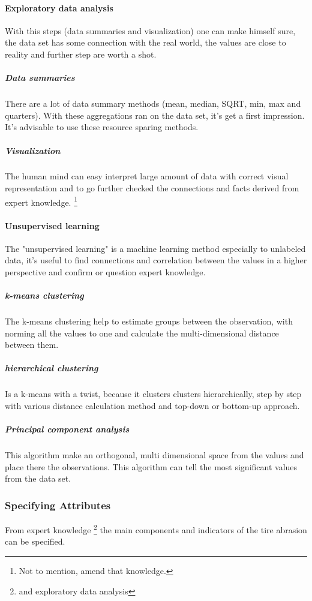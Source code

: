 		\paragraph{Exploratory data analysis}
			With this steps (data summaries and visualization) one can make himself sure, the data set has some connection with the real world, the values are close to reality and further step are worth a shot.
			\subparagraph{Data summaries}
			There are a lot of data summary methods (mean, median, SQRT, min, max and quarters). With these aggregations ran on the data set, it's get a first impression. It's advisable to use these resource sparing methods.
			\subparagraph{Visualization}
			The human mind can easy interpret large amount of data with correct visual representation and to go further checked the connections and facts derived from expert knowledge. \footnote{Not to mention, amend that knowledge.} 
		\paragraph{Unsupervised learning}
		The "unsupervised learning" is a machine learning method especially to unlabeled data, it's useful to find connections and correlation between the values in a higher perspective and confirm or question expert knowledge.

		\subparagraph{k-means clustering}
		\cite{k-means} The k-means clustering help to estimate groups between the observation, with norming all the values to one and calculate the multi-dimensional distance between them.
		\subparagraph{hierarchical clustering}
		\cite{h-clust} Is a k-means with a twist, because it clusters clusters hierarchically, step by step with various distance calculation method and top-down or bottom-up approach.
		\subparagraph{Principal component analysis}
		\cite{PCA}
		This algorithm make an orthogonal, multi dimensional space from the values and place there the observations. This algorithm can tell the most significant values from the data set.
	\subsubsection{Specifying Attributes}
	From expert knowledge \footnote{and exploratory data analysis} the main components and indicators of the tire abrasion can be specified.

